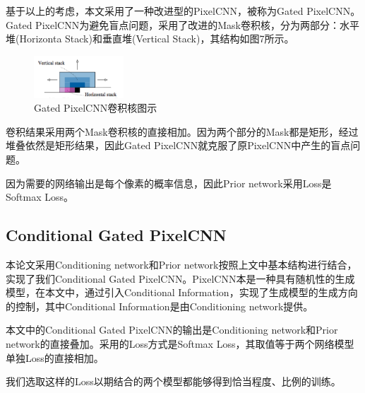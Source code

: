 基于以上的考虑，本文采用了一种改进型的PixelCNN，被称为Gated PixelCNN。Gated PixelCNN为避免盲点问题，采用了改进的Mask卷积核，分为两部分：水平堆(Horizonta Stack)和垂直堆(Vertical Stack)，其结构如图7所示。

\begin{figure}[htp]
    \centering
    \includegraphics[width=0.3\textwidth]{figures/盲点的消除.png}
    \caption{Gated PixelCNN卷积核图示}
\end{figure}

卷积结果采用两个Mask卷积核的直接相加。因为两个部分的Mask都是矩形，经过堆叠依然是矩形结果，因此Gated PixelCNN就克服了原PixelCNN中产生的盲点问题。

因为需要的网络输出是每个像素的概率信息，因此Prior network采用Loss是Softmax Loss。

\subsection{Conditional Gated PixelCNN}

本论文采用Conditioning network和Prior network按照上文中基本结构进行结合，实现了我们Conditional Gated PixelCNN。PixelCNN本是一种具有随机性的生成模型，在本文中，通过引入Conditional Information，实现了生成模型的生成方向的控制，其中Conditional Information是由Conditioning network提供。

本文中的Conditional Gated PixelCNN的输出是Conditioning network和Prior network的直接叠加。采用的Loss方式是Softmax Loss，其取值等于两个网络模型单独Loss的直接相加。

我们选取这样的Loss以期结合的两个模型都能够得到恰当程度、比例的训练。


